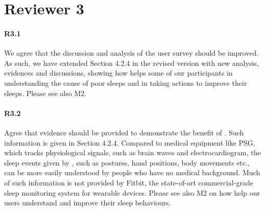 \section*{Reviewer 3}
\paragraph{R3.1} We agree that the discussion and analysis of the user survey should be improved. As such, we have extended Section 4.2.4
in the revised version with new analysis, evidences and discussions, showing how \systemname helps some of our participants in
understanding the cause of poor sleeps and in taking actions to improve their sleeps. Please see also M2.

\paragraph{R3.2} Agree that evidence should be provided to demonstrate the benefit of \systemname. Such information is given in Section
4.2.4. Compared to medical equipment like PSG, which tracks physiological signals, such as brain waves and electrocardiogram, the sleep
events given by \systemname, such as postures, hand positions, body movements etc., can be more easily understood by people who have no
medical background. Much of such information is not provided by Fitbit, the state-of-art commercial-grade sleep monitoring system for
wearable devices. Please see also M2 on how \systemname help our users understand and improve their sleep behaviours.
